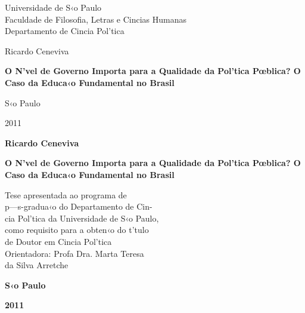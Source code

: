 \documentclass[a4paper, 12pt]{article}
\begin{document}
\sf \pagestyle{plain}
\thispagestyle{empty}

\begin{center}
\Large{Universidade de S‹o Paulo \\
Faculdade de Filosofia, Letras e Cincias Humanas \\
Departamento de Cincia Pol’tica}

\vspace*{3cm} 

\Large{Ricardo Ceneviva}

\vspace*{3cm} 

\Large\textbf{O N’vel de Governo Importa para a Qualidade da Pol’tica Pœblica? O Caso da Educa‹o Fundamental no Brasil}

\vspace*{7cm} 


S‹o Paulo 

2011

\end{center}
\pagebreak


\sf \pagestyle{plain}
\thispagestyle{empty}

\begin{center}

\Large\textbf{Ricardo Ceneviva}

\vspace*{4cm} 

\Large\textbf{O N’vel de Governo Importa para a Qualidade da Pol’tica Pœblica? O Caso da Educa‹o Fundamental no Brasil}

\vspace*{4cm} 

\begin{flushright}
\small{Tese apresentada ao programa de \\
p—s-gradua‹o do Departamento  de Cin-\\
cia Pol’tica da Universidade de S‹o Paulo, \\
como requisito para a obten‹o do t’tulo \\
de Doutor em Cincia Pol’tica\\
\vspace*{0.5cm} 
Orientadora: Profa Dra. Marta Teresa \\
da Silva Arretche}
\end{flushright}

\vspace*{3.5cm} 

\bf{S‹o Paulo} 

\bf{2011}

\end{center}
\pagebreak
\end{document}
